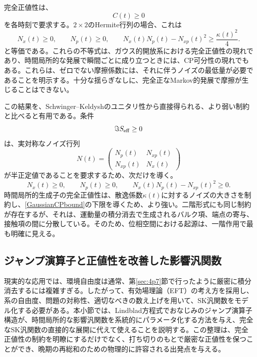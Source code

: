 \documentclass[a4paper,11pt,oneside]{article}
\theoremstyle{definition}
\numberwithin{equation}{section}
\begin{document}
完全正値性は、
\begin{equation}
C(t)\geq0
\end{equation}
を各時刻で要求する。\(2\times2\)のHermite行列の場合、これは
\begin{equation}
\label{GaussianCPbound}
N_x(t)\geq0,
\qquad
N_p(t)\geq0,
\qquad
N_x(t)N_p(t)-N_{xp}(t)^2
\geq
\frac{\kappa(t)^2}{4}.
\end{equation}
と等価である。これらの不等式は、ガウス的開放系における完全正値性の現れであり、時間局所的な発展で瞬間ごとに成り立つときには、CP可分性の現れでもある。これらは、ゼロでない摩擦係数には、それに伴うノイズの最低量が必要であることを明示する。十分な揺らぎなしに、完全正なMarkov的発展で摩擦が生じることはできない。



この結果を、Schwinger--Keldyshのユニタリ性から直接得られる、より弱い制約と比べると有用である。条件
\begin{equation}
\Im S_{\rm eff}\geq0
\end{equation}
は、実対称なノイズ行列
\begin{equation}
N(t)
=
\begin{pmatrix}
N_p(t) & N_{xp}(t)
\\
N_{xp}(t) & N_x(t)
\end{pmatrix}
\end{equation}
が半正定値であることを要求するため、次だけを導く。
\begin{equation}
N_x(t)\geq0,
\qquad
N_p(t)\geq0,
\qquad
N_x(t)N_p(t)-N_{xp}(t)^2\geq0.
\end{equation}
時間局所的生成子の完全正値性は、散逸係数\(\kappa(t)\)に対するノイズの大きさを制約し、\eqref{GaussianCPbound}の下限を導くため、より強い。二階形式にも同じ制約が存在するが、それは、運動量の積分消去で生成されるバルク項、端点の寄与、接触項の間に分散している。そのため、位相空間における起源は、一階作用で最も明確に見える。





\subsection{ジャンプ演算子と正値性を改善した影響汎関数}



現実的な応用では、環境自由度は通常、第\ref{sec:4p7}節で行ったように厳密に積分消去するには複雑すぎる。したがって、有効場理論（EFT）の考え方を採用し、系の自由度、問題の対称性、適切なべきの数え上げを用いて、SK汎関数をモデル化する必要がある。本小節では、Lindblad方程式でおなじみのジャンプ演算子構造が、時間局所的な影響汎関数を系統的にパラメータ化する方法を与え、完全なSK汎関数の直接的な展開に代えて使えることを説明する。この整理は、完全正値性の制約を明瞭にするだけでなく、打ち切りのもとで厳密な正値性を保つことができ、晩期の再総和のための物理的に許容される出発点を与える。
\end{document}
